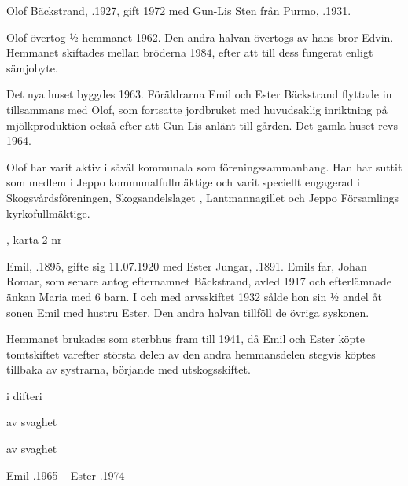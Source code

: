 Olof Bäckstrand, .1927, gift 1972 med Gun-Lis Sten från Purmo, .1931.



Olof övertog  ½ hemmanet 1962. Den andra  halvan övertogs av hans bror Edvin. Hemmanet skiftades mellan bröderna 1984, efter att till dess fungerat enligt sämjobyte.

Det nya huset byggdes 1963. Föräldrarna Emil och Ester Bäckstrand flyttade in tillsammans med Olof, som fortsatte jordbruket med huvudsaklig inriktning på mjölkproduktion också efter att Gun-Lis anlänt till gården. Det gamla huset revs 1964.

Olof har varit aktiv i såväl kommunala som föreningssammanhang. Han har suttit som medlem i Jeppo kommunalfullmäktige och varit speciellt engagerad i Skogsvårdsföreningen, Skogsandelslaget , Lantmannagillet och Jeppo Församlings kyrkofullmäktige.

, karta 2 nr 



Emil, .1895, gifte sig 11.07.1920 med Ester Jungar, .1891. Emils far, Johan Romar, som senare antog efternamnet Bäckstrand, avled 1917 och efterlämnade änkan Maria med 6 barn. I och med arvsskiftet 1932 sålde hon sin ½ andel åt sonen Emil  med hustru Ester. Den andra halvan tillföll de övriga syskonen.

Hemmanet brukades som sterbhus fram till 1941, då Emil och Ester köpte tomtskiftet varefter största delen av den andra hemmansdelen stegvis köptes tillbaka av systrarna, börjande med utskogsskiftet.
\begin{jhchildren}
  \item {}
  \item {} i difteri
  \item {}
  \item {}
  \item {} av svaghet
  \item {} av svaghet
\end{jhchildren}

Emil .1965  --  Ester .1974


